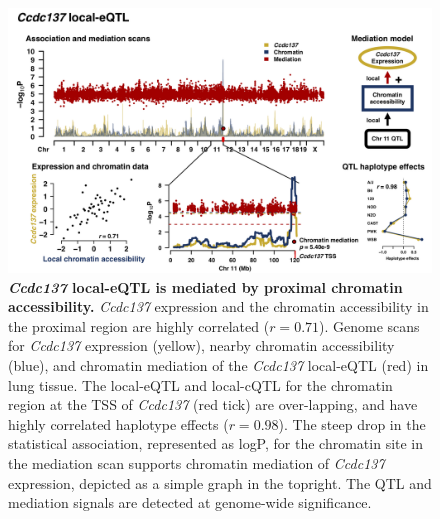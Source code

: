 \documentclass[9pt,twocolumn,twoside]{gsajnl}
\begin{document}
\begin{figure}[h]
\includegraphics[width=\textwidth, trim={0in 0in 0in 0in}, clip]{figs/ccdc137_mediation.png}
\caption{\textbf{\textit{Ccdc137} local-eQTL is mediated by proximal chromatin accessibility.} \textit{Ccdc137} expression and the chromatin accessibility in the proximal region are highly correlated ($r = 0.71$). Genome scans for \textit{Ccdc137} expression (yellow), nearby chromatin accessibility (blue), and chromatin mediation of the \textit{Ccdc137} local-eQTL (red) in lung tissue. The local-eQTL and local-cQTL for the chromatin region at the TSS of \textit{Ccdc137} (red tick) are over-lapping, and have highly correlated haplotype effects ($r = 0.98$). The steep drop in the statistical association, represented as logP, for the chromatin site in the mediation scan supports chromatin mediation of \textit{Ccdc137} expression, depicted as a simple graph in the topright. The QTL and mediation signals are detected at genome-wide significance. \label{fig:ccdc137_mediation}}
\end{figure}
\end{document}

